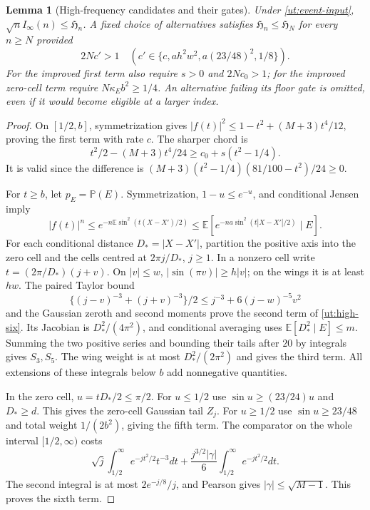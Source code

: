 \documentclass[aop,preprint]{imsart}
\newtheorem{lemma}[theorem]{Lemma}
\theoremstyle{definition}
\newcommand{\E}{\mathbb E}
\newcommand{\PP}{\mathbb P}
\numberwithin{equation}{section}
\begin{document}
\begin{lemma}[High-frequency candidates and their gates]\label{ut:high}
Under \eqref{ut:event-input}, $\sqrt n I_\infty(n)\le\mathfrak H_n$.
A fixed choice of alternatives satisfies
$\mathfrak H_n\le\mathfrak H_N$ for every $n\ge N$ provided
\begin{equation}\label{ut:high-gates}
 2Nc'>1\quad
 (c'\in\{c,ah^2w^2,a(23/48)^2,1/8\}).
\end{equation}
For the improved first term also require $s>0$ and $2Nc_0>1$;
for the improved zero-cell term require $N\kappa_Eb^2\ge1/4$.
An alternative failing its floor gate is omitted, even if it would
become eligible at a larger index.
\end{lemma}
\begin{proof}
On $[1/2,b]$, symmetrization gives
$|f(t)|^2\le1-t^2+(M+3)t^4/12$, proving the first term with rate
$c$. The sharper chord is
\[
 t^2/2-(M+3)t^4/24\ge c_0+s(t^2-1/4).
\]
It is valid since the difference is
$(M+3)(t^2-1/4)(81/100-t^2)/24\ge0$.

For $t\ge b$, let $p_E=\PP(E)$. Symmetrization, $1-u\le e^{-u}$,
and conditional Jensen imply
\[
 |f(t)|^n\le e^{-n\E\sin^2(t(X-X')/2)}
 \le\E[e^{-na\sin^2(t|X-X'|/2)}\mid E].
\]
For each conditional distance $D_*=|X-X'|$, partition the positive
axis into the zero cell and the cells centred at
$2\pi j/D_*$, $j\ge1$. In a nonzero cell write
$t=(2\pi/D_*)(j+v)$. On $|v|\le w$,
$|\sin(\pi v)|\ge h|v|$; on the wings it is at least $hw$.
The paired Taylor bound
\[
 \{(j-v)^{-3}+(j+v)^{-3}\}/2
             \le j^{-3}+6(j-w)^{-5}v^2
\]
and the Gaussian zeroth and second moments prove the second term
of \eqref{ut:high-six}. Its Jacobian is
$D_*^2/(4\pi^2)$, and conditional averaging uses
$\E[D_*^2\mid E]\le m$. Summing the two positive series and
bounding their tails after $20$ by integrals gives $S_3,S_5$.
The wing weight is at most $D_*^2/(2\pi^2)$ and gives the third term.
All extensions of these integrals below $b$ add nonnegative quantities.

In the zero cell, $u=tD_*/2\le\pi/2$.
For $u\le1/2$ use $\sin u\ge(23/24)u$ and $D_*\ge d$.
This gives the zero-cell Gaussian tail $Z_j$.
For $u\ge1/2$ use $\sin u\ge23/48$ and total weight
$1/(2b^2)$, giving the fifth term.
The comparator on the whole interval $[1/2,\infty)$ costs
\[
 \sqrt j\int_{1/2}^\infty e^{-jt^2/2}t^{-3}dt
 +\frac{j^{3/2}|\gamma|}{6}\int_{1/2}^\infty e^{-jt^2/2}dt.
\]
The second integral is at most $2e^{-j/8}/j$, and Pearson gives
$|\gamma|\le\sqrt{M-1}$. This proves the sixth term.


\end{proof}
\end{document}
